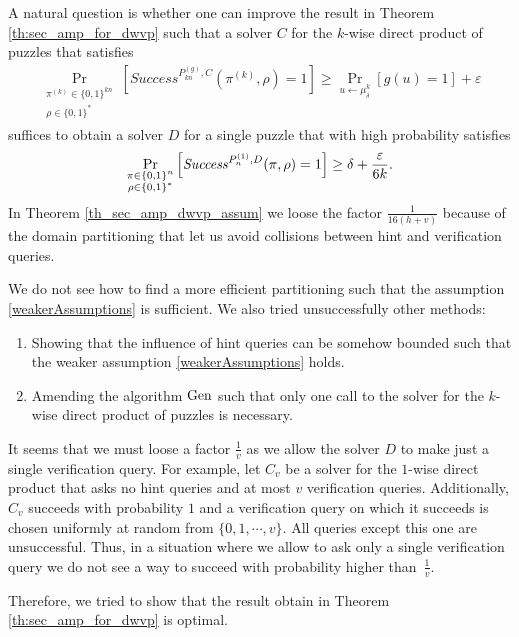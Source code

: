 A natural question is whether one can improve the result in Theorem \ref{th:sec_amp_for_dwvp} such that a solver $C$ for the $k$-wise direct product of puzzles that satisfies
\begin{align}
    \label{weakerAssumptions}
    \underset{\substack{\pi^{(k)} \in \{0,1\}^{kn} \\ \rho \in \{0,1\}^{*}}}{\Pr}\left[\mathit{Success}^{P_{kn}^{(g)}, C}(\pi^{(k)}, \rho) = 1\right]
    \geq \underset{u \leftarrow \mu_\delta^k}{\Pr}[g(u) = 1] + \varepsilon
\end{align}
suffices to obtain a solver $D$ for a single puzzle that with high probability satisfies
  \begin{align}
    \underset{\substack{\pi \in \{0,1\}^{n} \\ \rho \in \{0,1\}^{*}}}
    {\Pr}\left[\operatorname{\mathit{Success}}^{P_{n}^{(1)},D}(\pi, \rho) = 1\right] \geq \delta + \frac{\varepsilon}{6k}.
  \end{align}
In Theorem \ref{th_sec_amp_dwvp_assum} we loose the factor $\frac{1}{16(h+v)}$ because of the domain partitioning that let us avoid collisions between hint and verification queries.

We do not see how to find a more efficient partitioning such that the assumption \eqref{weakerAssumptions} is sufficient.
We also tried unsuccessfully other methods:
\begin{enumerate}[]
  \item Showing that the influence of hint queries can be somehow bounded such that the weaker assumption \eqref{weakerAssumptions} holds. \\
  \item Amending the algorithm $\operatorname{\text{Gen}}$ such that only one call to the solver for the $k$-wise direct product of puzzles is necessary.
\end{enumerate}

It seems that we must loose a factor $\frac{1}{v}$ as we allow the solver $D$ to make just a single verification query.
For example, let $C_v$ be a solver for the $1$-wise direct product that asks no hint queries and at most $v$ verification queries.
Additionally, $C_v$ succeeds with probability $1$ and a verification query on which it succeeds is chosen uniformly at random from $\{0,1, \cdots, v\}$.
All queries except this one are unsuccessful.
Thus, in a situation where we allow to ask only a single verification query we do not see a way to succeed with probability higher than~$\frac{1}{v}$.

Therefore, we tried to show that the result obtain in Theorem \ref{th:sec_amp_for_dwvp} is optimal.

